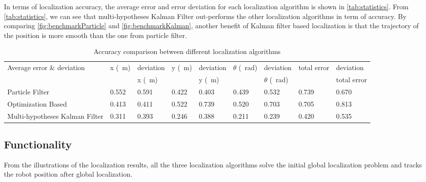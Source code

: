 In terms of localization accuracy, the average error and error deviation for each localization algorithm is shown in \autoref{tab:statistics}. From \autoref{tab:statistics}, we can see that multi-hypotheses Kalman Filter out-performs the other localization algorithms in term of accuracy. By comparing \autoref{fig:benchmarkParticle} and \autoref{fig:benchmarkKalman}, another benefit of  Kalman filter based localization is that the trajectory of the position is more smooth than the one from particle filter.
\begin{table}[h!]
  \centering
  \caption{Accuracy comparison between different localization algorithms}
  \label{tab:statistics}
  \begin{adjustbox}{max width=\textwidth}
    \begin{tabular}{l|l|l|l|l|l|l|l|l}
      Average error  \& deviation & x (\SI{}{\meter})                   &  deviation     & y  (\SI{}{\meter})                   & deviation        & $\theta$  (\SI{}{\radian})            &deviation    & total error         &deviation           \\
      &                     & x (\SI{}{\meter})&                     &  y (\SI{}{\meter})&                     &  $\theta$ (\SI{}{\radian}) &                     & total error\\ \hline
      Particle Filter                & 0.552& 0.591 & 0.422 & 0.403 & 0.439 & 0.532 & 0.739 & 0.670   \\ \hline
      Optimization Based            & 0.413 & 0.411 & 0.522 & 0.739 & 0.520 & 0.703 & 0.705 & 0.813   \\ \hline
      Multi-hypotheses Kalman Filter & 0.311 & 0.393 & 0.246 & 0.388 & 0.211 & 0.239 & 0.420 & 0.535  
    \end{tabular}
  \end{adjustbox}
\end{table}

\subsection{Functionality}
\label{sub:Functionality}

From the illustrations of the localization results, all the three localization algorithms solve the initial global localization problem and tracks the robot position after global localization. 

